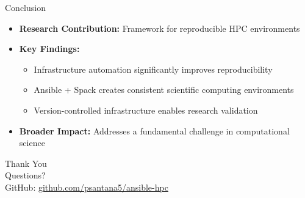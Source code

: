 \documentclass[aspectratio=169]{beamer}
\begin{document}
\begin{frame}{Conclusion}
  \begin{itemize}
    \item \textbf{Research Contribution:} Framework for reproducible HPC environments
    \item \textbf{Key Findings:}
      \begin{itemize}
        \item Infrastructure automation significantly improves reproducibility
        \item Ansible + Spack creates consistent scientific computing environments
        \item Version-controlled infrastructure enables research validation
      \end{itemize}
    \item \textbf{Broader Impact:} Addresses a fundamental challenge in computational science
  \end{itemize}
  
  \vspace{0.5cm}
  \begin{center}
    \Large{Thank You}\\
    \vspace{0.3cm}
    \normalsize{Questions?}\\
    \vspace{0.3cm}
    \small{GitHub: \href{https://github.com/psantana5/ansible-hpc}{github.com/psantana5/ansible-hpc}}
  \end{center}
\end{frame}
\end{document}

